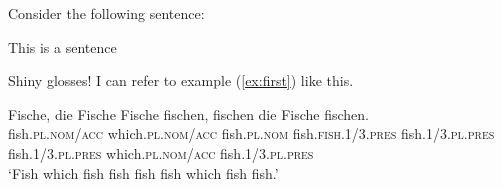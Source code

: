 \documentclass{article}
\begin{document}
Consider the following sentence:

\begin{exe}
\ex\label{ex:first} This is a sentence
\ex
    \begin{xlist}
    \end{xlist}

\end{exe}

Shiny glosses!  I can refer to example (\ref{ex:first}) like this. %

\begin{exe}
    \ex
        \gll 
        Fische, die Fische Fische fischen, fischen die Fische fischen.\\ 
        fish.\textsc{pl.nom/acc} which.\textsc{pl.nom/acc} fish.\textsc{pl.nom} fish.\textsc{fish.1/3.pres} fish.\textsc{1/3.pl.pres} fish.\textsc{1/3.pl.pres} which.\textsc{pl.nom/acc} fish.\textsc{1/3.pl.pres}\\ 
        `Fish which fish fish fish fish which fish fish.'

\end{exe}
\end{document}
